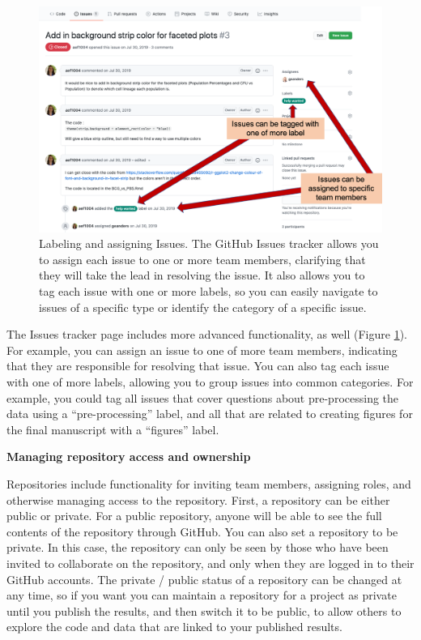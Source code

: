 \documentclass[]{tufte-book}
\begin{document}
\begin{figure}
\includegraphics[width=\textwidth]{figures/github_issues3} \caption[Labeling and assigning Issues]{Labeling and assigning Issues. The GitHub Issues tracker allows you to assign each issue to one or more team members, clarifying that they will take the lead in resolving the issue. It also allows you to tag each issue with one or more labels, so you can easily navigate to issues of a specific type or identify the category of a specific issue.}\label{fig:githubissues3}
\end{figure}

The Issues tracker page includes more advanced functionality, as well
(Figure \ref{fig:githubissues3}). For example, you can assign an issue to one
of more team members, indicating that they are responsible for resolving that
issue. You can also tag each issue with one of more labels, allowing you to
group issues into common categories. For example, you could tag all issues that
cover questions about pre-processing the data using a ``pre-processing'' label,
and all that are related to creating figures for the final manuscript with a
``figures'' label.

\textbf{Managing repository access and ownership}

Repositories include functionality for inviting team members, assigning
roles, and otherwise managing access to the repository. First, a repository
can be either public or private. For a public repository, anyone will be
able to see the full contents of the repository through GitHub. You can
also set a repository to be private. In this case, the repository can only
be seen by those who have been invited to collaborate on the repository, and
only when they are logged in to their GitHub accounts. The private / public
status of a repository can be changed at any time, so if you want you can
maintain a repository for a project as private until you publish the results,
and then switch it to be public, to allow others to explore the code and data
that are linked to your published results.
\end{document}
